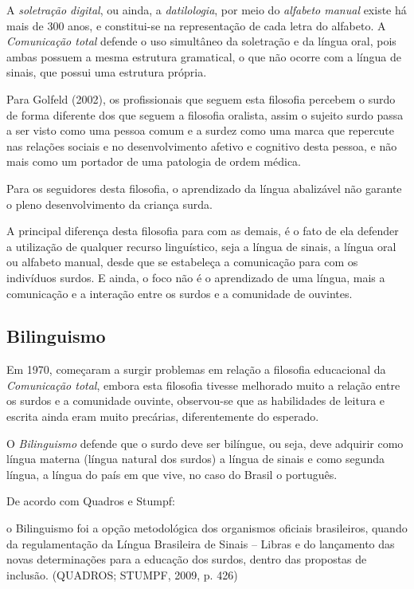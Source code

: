 \documentclass[brasil]{abnt}
\begin{document}
		 A \textit{soletração digital}, ou ainda, a \textit{datilologia}, por meio do \textit{alfabeto manual} existe há mais de 300 anos, e constitui-se na representação de cada letra do alfabeto. 
		 A \textit{Comunicação total} defende o uso simultâneo da soletração e da língua oral, pois ambas possuem a mesma estrutura gramatical, o que não ocorre com a língua de sinais, que possui uma estrutura
		 própria.  
		
		 Para Golfeld (2002), os profissionais que seguem esta filosofia percebem o surdo de forma diferente dos que seguem a filosofia oralista, assim o sujeito surdo passa a ser visto como uma pessoa comum 
		 e a surdez como uma marca que repercute nas relações sociais e no desenvolvimento afetivo e cognitivo desta pessoa, e não mais como um portador de uma patologia de ordem médica.
		 
		 Para os seguidores desta filosofia, o aprendizado da língua abalizável não garante o pleno desenvolvimento da criança surda.
		 
		 A principal diferença desta filosofia para com as demais, é o fato de ela defender a utilização de qualquer recurso linguístico, seja a língua de sinais, a língua oral ou alfabeto manual, desde que 
		 se estabeleça a comunicação para com os indivíduos surdos. E ainda, o foco não é o aprendizado de uma língua, mais a comunicação e a interação entre os surdos e a comunidade de ouvintes.
		 
		\subsection{Bilinguismo}
			Em 1970, começaram a surgir problemas em relação a filosofia educacional da \textit{Comunicação total}, embora esta filosofia tivesse melhorado muito a relação entre os surdos e a comunidade 
			ouvinte, observou-se que as habilidades de leitura e escrita ainda eram muito precárias, diferentemente do esperado. 
			
			O \textit{Bilinguismo} defende que o surdo deve ser bilíngue, ou seja, deve adquirir como língua materna (língua natural dos surdos) a língua de sinais e como segunda língua, a língua do país em 
			que vive, no caso do Brasil o português.
			
			De acordo com Quadros e Stumpf:
			
				\begin{citacao}o Bilinguismo foi a opção metodológica dos organismos oficiais brasileiros, quando da regulamentação da Língua Brasileira de Sinais – Libras e do lançamento das novas 
								determinações para a educação dos surdos, dentro das propostas de inclusão. (QUADROS; STUMPF, 2009, p. 426)
				\end{citacao}
			
\end{document}
